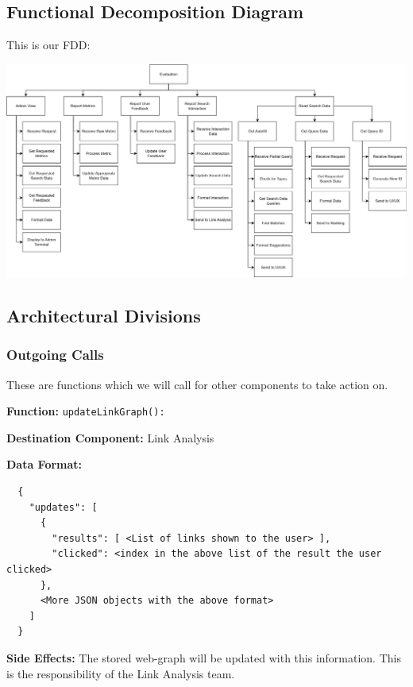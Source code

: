\newpage
\subsection*{Functional Decomposition Diagram}

This is our FDD:
\begin{center}
  \includegraphics[width=\textwidth]{FDD/FDD.png}
\end{center}

\subsection*{Architectural Divisions}

\subsubsection*{Outgoing Calls}

These are functions which we will call for other components to take action on.

\medskip

\textbf{Function:} \verb|updateLinkGraph():|

\smallskip

\textbf{Destination Component:} Link Analysis

\smallskip

\textbf{Data Format:} \begin{verbatim}
  {
    "updates": [
      {
        "results": [ <List of links shown to the user> ],
        "clicked": <index in the above list of the result the user clicked>
      },
      <More JSON objects with the above format>
    ]
  }
\end{verbatim}

\smallskip

\textbf{Side Effects:} The stored web-graph will be updated with this information. This is the responsibility of the Link Analysis team.

